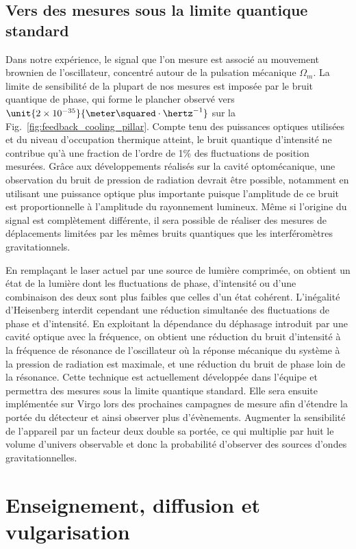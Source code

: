 \documentclass[12pt,a4paper]{article}
\begin{document}
\subsection{Vers des mesures sous la limite quantique standard}
\label{sec:prospects}

Dans notre expérience, le signal que l'on mesure est associé au mouvement brownien de l'oscillateur, concentré autour de la pulsation mécanique $\Omega_m$.
La limite de sensibilité de la plupart de nos mesures est imposée par le bruit quantique de phase, qui forme le plancher observé vers $\unit{2\times10^{-35}}{\meter\squared\cdot\hertz^{-1}}$ sur la Fig.~\ref{fig:feedback_cooling_pillar}.
Compte tenu des puissances optiques utilisées et du niveau d'occupation thermique atteint, le bruit quantique d'intensité ne contribue qu'à une fraction de l'ordre de \unit{1}{\%} des fluctuations de position mesurées.
Grâce aux développements réalisés sur la cavité optomécanique, une observation du bruit de pression de radiation devrait être possible, notamment en utilisant une puissance optique plus importante puisque l'amplitude de ce bruit est proportionnelle à l'amplitude du rayonnement lumineux.
Même si l'origine du signal est complètement différente, il sera possible de réaliser des mesures de déplacements limitées par les mêmes bruits quantiques que les interféromètres gravitationnels.

En remplaçant le laser actuel par une source de lumière comprimée, on obtient un état de la lumière dont les fluctuations de phase, d'intensité ou d'une combinaison des deux sont plus faibles que celles d'un état cohérent.
L'inégalité d'Heisenberg interdit cependant une réduction simultanée des fluctuations de phase et d'intensité.
En exploitant la dépendance du déphasage introduit par une cavité optique avec la fréquence, on obtient une réduction du bruit d'intensité à la fréquence de résonance de l'oscillateur où la réponse mécanique du système à la pression de radiation est maximale,  et une réduction du bruit de phase loin de la résonance.
Cette technique est actuellement développée dans l'équipe et permettra des mesures sous la limite quantique standard.
Elle sera ensuite implémentée sur Virgo lors des prochaines campagnes de mesure afin d'étendre la portée du détecteur et ainsi observer plus d'évènements.
Augmenter la sensibilité de l'appareil par un facteur deux double sa portée, ce qui multiplie par huit le volume d'univers observable et donc la probabilité d'observer des sources d'ondes gravitationnelles.

\section{Enseignement, diffusion et vulgarisation}
\end{document}
